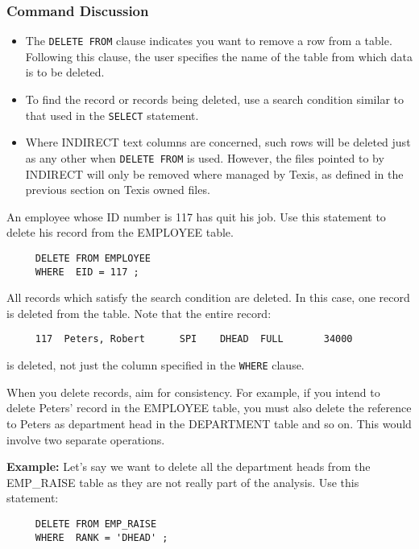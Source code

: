 \subsubsection{Command Discussion}

\begin{itemize}
\item The {\tt DELETE FROM} clause indicates you want to remove a row from a
table.  Following this clause, the user specifies the name of the
table from which data is to be deleted.

\item To find the record or records being deleted, use a search
condition similar to that used in the \verb`SELECT` statement.

\item Where INDIRECT text columns are concerned, such rows will be
deleted just as any other when {\tt DELETE FROM} is used.  However, the
files pointed to by INDIRECT will only be removed where managed by
Texis, as defined in the previous section on Texis owned files.
\end{itemize}

An employee whose ID number is 117 has quit his job.  Use this
statement to delete his record from the EMPLOYEE table.

\begin{verbatim}
     DELETE FROM EMPLOYEE
     WHERE  EID = 117 ;
\end{verbatim}

All records which satisfy the search condition are deleted.  In this
case, one record is deleted from the table.  Note that the entire
record:
\begin{verbatim}
     117  Peters, Robert      SPI    DHEAD  FULL       34000
\end{verbatim}
is deleted, not just the column specified in the \verb`WHERE` clause.

When you delete records, aim for consistency.  For example, if you
intend to delete Peters' record in the EMPLOYEE table, you must also
delete the reference to Peters as department head in the DEPARTMENT
table and so on.  This would involve two separate operations.

{\bf Example:}
Let's say we want to delete all the department heads from the
EMP\_RAISE table as they are not really part of the analysis.  Use
this statement:

\begin{verbatim}
     DELETE FROM EMP_RAISE
     WHERE  RANK = 'DHEAD' ;
\end{verbatim}

